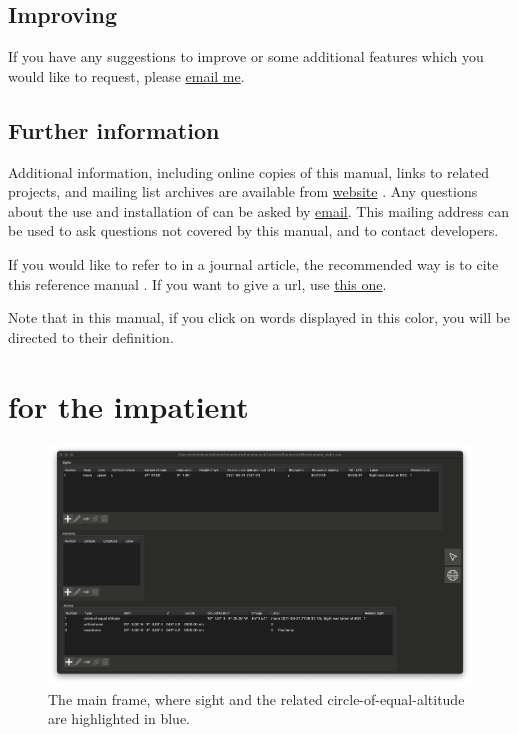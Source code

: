 \documentclass{ol-softwaremanual}
\begin{document}
\subsection{Improving \thel}

If you have any suggestions to improve \thel or some additional features which you would like to request, please \href{\contactemail}{email me}. 

\subsection{Further information}


Additional information, including online copies of this manual, links to related projects, and mailing list archives are available from \thel \href{\thelemacusurl}{website}  .
Any questions about the use and installation of \thel can be asked by \href{\contactemail}{email}. This mailing address can be used to ask questions not covered by this manual, and to contact \thel developers.

If you would like to refer to \thel in a journal article, the recommended way is to cite this reference manual \cite{castellana2024thelemacus-documentation}. If you want to give a url, use  \href{\thelemacusurl}{this one}. 

\pagebreak

Note that in this manual, if you click on words displayed in {\color{glossary-link-color} this color}, you will be directed to their definition. 

\section{\thel for the impatient}\label{sec-impatient}

\begin{figure}
  \centering
  \includegraphics[width=1\textwidth]{figures/list-frame.png}
  \caption{
    \label{fig-list-frame}
    The main frame, where  \gls{sight} and the related \gls{circle-of-equal-altitude} are highlighted in blue.  
  }
  \end{figure}
\end{document}
